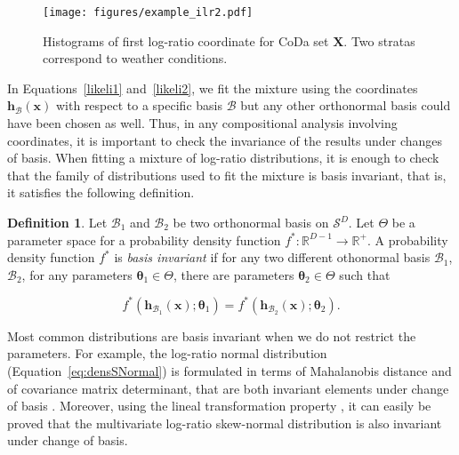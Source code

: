 \documentclass[12pt, a4paper]{article}
\newcommand{\m}[1]{\boldsymbol{#1}}
\theoremstyle{definition}
\newtheorem{definition}{Definition}
\begin{document}
\begin{figure}[thbp]
\centering
\texttt{[image: figures/example\_ilr2.pdf]}
\caption{Histograms of first log-ratio coordinate for CoDa set $\mathbf{X}$. Two stratas correspond to weather conditions.}\label{example_ilr2}
\end{figure}
% 

In Equations~\ref{likeli1} and~\ref{likeli2}, we fit the mixture using the coordinates $\textbf{h}_\mathcal{B}(\textbf{x})$ with respect to a specific basis $\mathcal{B}$ but any other orthonormal basis could have been chosen as well. Thus, in any compositional analysis involving coordinates, it is important to check the invariance of the results under changes of basis. When fitting a mixture of log-ratio distributions, it is enough to check that the family of distributions used to fit the mixture is basis invariant, that is, it satisfies the following definition. 


\begin{definition}
Let $\mathcal{B}_1$ and $\mathcal{B}_2$ be two orthonormal basis on $\mathcal{S}^D$. Let $\Theta$ be a parameter space for a probability density function $f^*: \mathbb{R}^{D-1} \rightarrow \mathbb{R}^+$. 
A probability density function $f^*$ is \emph{basis invariant} if for any two different othonormal basis $\mathcal{B}_1$, $\mathcal{B}_2$, for any parameters $\m\theta_1 \in \Theta$, there are parameters $\m\theta_2 \in \Theta$ such that

\vspace{-1.25cm}
$$
f^*(\textbf{h}_{\mathcal{B}_1}(\textbf{x}); \m\theta_1) = f^*(\textbf{h}_{\mathcal{B}_2}(\textbf{x}); \m\theta_2).
$$
\end{definition}


Most common distributions are basis invariant when we do not restrict the parameters. For example, the log-ratio normal distribution (Equation~\ref{eq:densSNormal}) is formulated in terms of Mahalanobis distance and of covariance matrix determinant, that are both invariant elements under change of basis  \citep{barcelo1999comment}. Moreover,  using the lineal transformation property \citep{azzalini1999statistical}, it can easily be proved that the multivariate log-ratio skew-normal distribution is also invariant under change of basis. 
\end{document}
